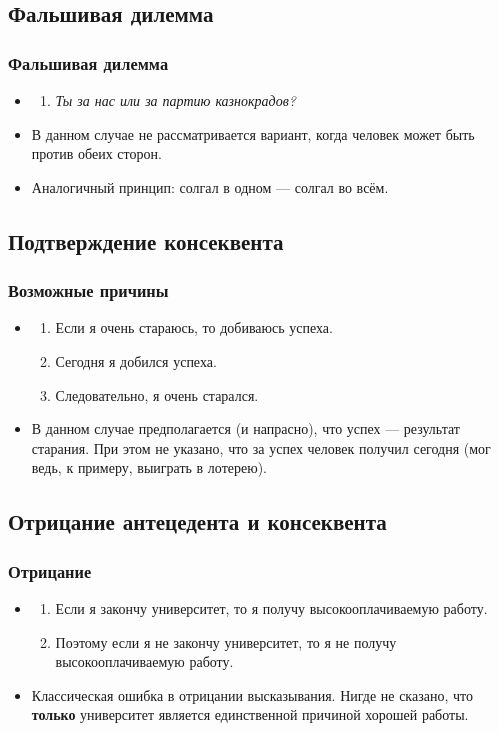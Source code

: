 \documentclass[compress,red]{beamer}
\begin{document}
\subsection{Фальшивая дилемма}
\begin{frame}[fragile]
  \frametitle{Фальшивая дилемма}
  \begin{itemize}
    \item
    \begin{enumerate}
      \item \emph{Ты за нас или за партию казнокрадов?}
    \end{enumerate}
    \item В данном случае не рассматривается вариант, когда человек может быть против обеих сторон.
    \item Аналогичный принцип: солгал в одном --- солгал во всём.
  \end{itemize}
\end{frame}

\subsection{Подтверждение консеквента}
\begin{frame}[fragile]
  \frametitle{Возможные причины}
  \begin{itemize}
    \item
    \begin{enumerate}
      \item Если я очень стараюсь, то добиваюсь успеха.
      \item Сегодня я добился успеха.
      \item Следовательно, я очень старался.
    \end{enumerate}
    \item В данном случае предполагается (и напрасно), что успех --- результат старания. При этом не указано, что за успех человек получил сегодня (мог ведь, к примеру, выиграть в лотерею).
  \end{itemize}
\end{frame}

\subsection{Отрицание антецедента и консеквента}
\begin{frame}[fragile]
  \frametitle{Отрицание}
  \begin{itemize}
    \item
    \begin{enumerate}
      \item Если я закончу университет, то я получу высокооплачиваемую работу.
      \item Поэтому если я не закончу университет, то я не получу высокооплачиваемую работу.
    \end{enumerate}
    \item Классическая ошибка в отрицании высказывания. Нигде не сказано, что \textbf{только} университет является единственной причиной хорошей работы.
  \end{itemize}
\end{frame}
\end{document}
